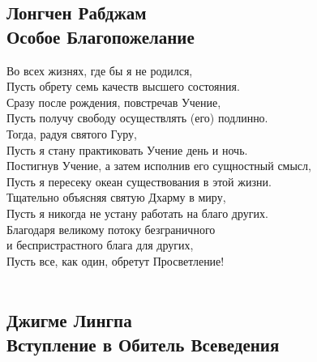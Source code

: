 \subsection{Лонгчен Рабджам\\Особое Благопожелание}

Во всех жизнях, где бы я не родился,\\
Пусть обрету семь качеств высшего состояния.\\
Сразу после рождения, повстречав Учение,\\
Пусть получу свободу осуществлять (его) подлинно.\\
Тогда, радуя святого Гуру,\\
Пусть я стану практиковать Учение день и ночь.\\
Постигнув Учение, а затем исполнив его сущностный смысл,\\
Пусть я пересеку океан существования в этой жизни.\\
Тщательно объясняя святую Дхарму в миру,\\
Пусть я никогда не устану работать на благо других.\\
Благодаря великому потоку безграничного\\
и беспристрастного блага для других,\\
Пусть все, как один, обретут Просветление!\\
\\


\newpage
\subsection{Джигме Лингпа\\Вступление в Обитель Всеведения}

